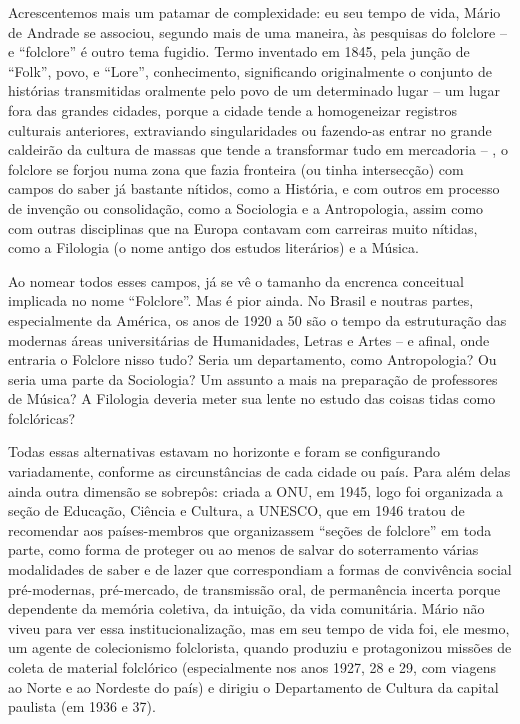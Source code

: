 Acrescentemos mais um patamar de complexidade: eu seu tempo de vida,
Mário de Andrade se associou, segundo mais de uma maneira, às pesquisas
do folclore -- e ``folclore'' é outro tema fugidio. Termo inventado em
1845, pela junção de ``Folk'', povo, e ``Lore'', conhecimento,
significando originalmente o conjunto de histórias transmitidas
oralmente pelo povo de um determinado lugar -- um lugar fora das grandes
cidades, porque a cidade tende a homogeneizar registros culturais
anteriores, extraviando singularidades ou fazendo-as entrar no grande
caldeirão da cultura de massas que tende a transformar tudo em
mercadoria -- , o folclore se forjou numa zona que fazia fronteira (ou
tinha intersecção) com campos do saber já bastante nítidos, como a
História, e com outros em processo de invenção ou consolidação, como a
Sociologia e a Antropologia, assim como com outras disciplinas que na
Europa contavam com carreiras muito nítidas, como a Filologia (o nome
antigo dos estudos literários) e a Música.

Ao nomear todos esses campos, já se vê o tamanho da encrenca conceitual
implicada no nome ``Folclore''. Mas é pior ainda. No Brasil e noutras
partes, especialmente da América, os anos de 1920 a 50 são o tempo da
estruturação das modernas áreas universitárias de Humanidades, Letras e
Artes -- e afinal, onde entraria o Folclore nisso tudo? Seria um
departamento, como Antropologia? Ou seria uma parte da Sociologia? Um
assunto a mais na preparação de professores de Música? A Filologia
deveria meter sua lente no estudo das coisas tidas como folclóricas?

Todas essas alternativas estavam no horizonte e foram se configurando
variadamente, conforme as circunstâncias de cada cidade ou país. Para
além delas ainda outra dimensão se sobrepôs: criada a ONU, em 1945, logo
foi organizada a seção de Educação, Ciência e Cultura, a UNESCO, que em
1946 tratou de recomendar aos países-membros que organizassem ``seções
de folclore'' em toda parte, como forma de proteger ou ao menos de
salvar do soterramento várias modalidades de saber e de lazer que
correspondiam a formas de convivência social pré-modernas, pré-mercado,
de transmissão oral, de permanência incerta porque dependente da memória
coletiva, da intuição, da vida comunitária. Mário não viveu para ver
essa institucionalização, mas em seu tempo de vida foi, ele mesmo, um
agente de colecionismo folclorista, quando produziu e protagonizou
missões de coleta de material folclórico (especialmente nos anos 1927,
28 e 29, com viagens ao Norte e ao Nordeste do país) e dirigiu o
Departamento de Cultura da capital paulista (em 1936 e 37).


